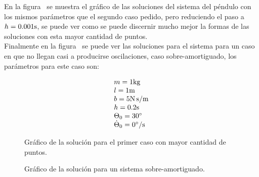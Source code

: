 
En la figura~ se muestra el gráfico de las soluciones del sistema del péndulo con los mismos parámetros que el segundo caso pedido, pero reduciendo el paso a $h = 0.001 \si[per-mode=symbol]{\second}$, se puede ver como se puede discernir mucho mejor la formas de las soluciones con esta mayor cantidad de puntos.\\
Finalmente en la figura~ se puede ver las soluciones para el sistema para un caso en que no llegan casi a producirse oscilaciones, caso sobre-amortiguado, los parámetros para este caso son: 

\begin{equation*}
                \begin{array}{ll}
                  m = 1 \si[per-mode=symbol]{\kilo\gram} \\
                  l = 1 \si[per-mode=symbol]{\meter} \\  
                  b = 5 \si[per-mode=symbol]{\newton\second\per\meter} \\ 
                  h = 0.2 \si[per-mode=symbol]{\second} \\   
                  \Theta_{0} = 30 \si[per-mode=symbol]{\degree} \\  
                  \dot{\Theta}_{0} = 0 \si[per-mode=symbol]{\degree\per\second} \\            
                \end{array}
\end{equation*}




\clearpage


\begin{figure}[H] %
\begin{center}
\caption{\label{fig:fig_res_3}\footnotesize{Gráfico de la solución para el primer caso con mayor cantidad de puntos.}}
\end{center}
\end{figure}

\clearpage


\begin{figure}[H] %
\begin{center}
\caption{\label{fig:fig_res_4}\footnotesize{Gráfico de la solución para un sistema sobre-amortiguado.}}
\end{center}
\end{figure}
